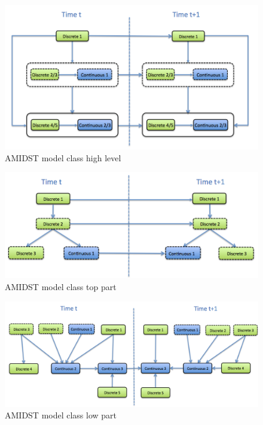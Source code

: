 \begin{figure}[ht!]
\begin{center}
\includegraphics[scale=0.4]{./figures/AMIDSTModelClassHighLevel}
\caption{\label{Figure:AMIDSTModelClassHighLevel} AMIDST model class high level}
\end{center}
\end{figure}

\begin{figure}[ht!]
\begin{center}
\includegraphics[scale=0.4]{./figures/AMIDSTModelClassTopPart}
\caption{\label{Figure:AMIDSTModelClassHighLevel} AMIDST model class top part}
\end{center}
\end{figure}

\begin{figure}[ht!]
\begin{center}
\includegraphics[scale=0.4]{./figures/AMIDSTModelClassLowPart}
\caption{\label{Figure:AMIDSTModelClassHighLevel} AMIDST model class low part}
\end{center}
\end{figure}